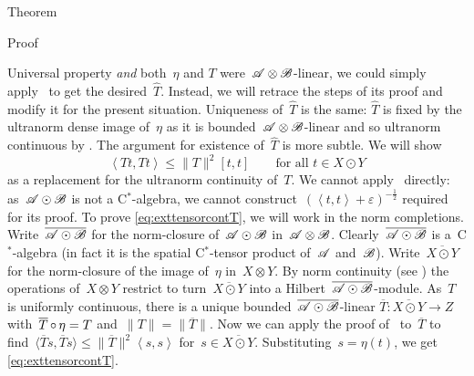 \begin{parsec}
\begin{point}{Theorem}
\begin{point}{Proof}
\begin{point}{Universal property}
    \emph{and} both~$\eta$ and $T$ were~$\mathscr{A} \otimes \mathscr{B}$-linear,
    we could simply apply~
    to get the desired~$\hat{T}$.
Instead, we will retrace the steps of its proof
    and modify it for the present situation.
Uniqueness of~$\hat{T}$ is the same:
    $\hat{T}$ is fixed by the ultranorm dense image of~$\eta$
    as it is bounded~$\mathscr{A}\otimes\mathscr{B}$-linear
    and so ultranorm continuous by .
The argument for existence of~$\hat{T}$ is more subtle.
We will show
\begin{equation}\label{eq:exttensorcontT}
    \left<T t, T t\right> \leq \|T\|^2 [t,t]
        \qquad \text{for all~$t \in X \odot Y$}
\end{equation}
as a replacement for the ultranorm continuity of~$T$.
We cannot apply~ directly:
    as~$\mathscr{A} \odot \mathscr{B}$ is not a C$^*$-algebra,
    we cannot construct~$(\left<t,t\right>+\varepsilon)^{-\frac{1}{2}}$
    required for its proof.
To prove \eqref{eq:exttensorcontT}, we will work in the norm completions.
Write~$\overline{\mathscr{A} \odot \mathscr{B}}$
    for the norm-closure of~$\mathscr{A} \odot \mathscr{B}$ in~$\mathscr{A} \otimes \mathscr{B}$.
Clearly~$\overline{\mathscr{A} \odot \mathscr{B}}$
    is a~C$^*$-algebra
    (in fact it is the spatial C$^*$-tensor product of~$\mathscr{A}$ and~$\mathscr{B}$).
Write~$\overline{X \odot Y}$
    for the norm-closure of the image of~$\eta$ in~$X \otimes Y$.
By norm continuity
    (see )
    the operations of~$X \otimes Y$
    restrict to turn~$\overline{X \odot Y}$ into a
    Hilbert~$\overline{\mathscr{A} \odot \mathscr{B}}$-module.
As~$T$ is uniformly continuous,
    there is a unique bounded~$\overline{\mathscr{A}\odot\mathscr{B}}$-linear
    $\overline{T}\colon \overline{X\odot Y} \to Z$
    with~$\overline{T} \mathop{\circ} \eta = T$ and~$\|T\| = \|\overline{T}\|$.
Now we can apply the proof of~
    to~$\overline{T}$
    to find~$\langle \overline{T}s,\overline{T}s\rangle \leq
    \|\overline{T}\|^2\left<s,s\right>$
    for~$s \in \overline{X \odot Y}$.
Substituting~$s = \eta(t)$,
    we get \eqref{eq:exttensorcontT}.


\end{point}
\end{point}
\end{point}
\end{parsec}
